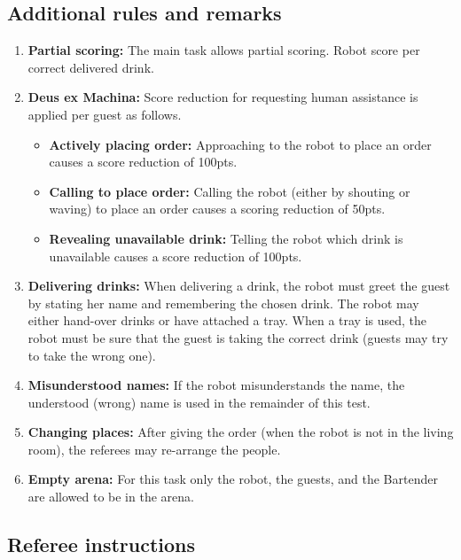 \subsection*{Additional rules and remarks}
\begin{enumerate}
	\item \textbf{Partial scoring:} The main task allows partial scoring.
	Robot score per correct delivered drink.

	\item \textbf{Deus ex Machina:} Score reduction for requesting human assistance is applied per guest as follows.
	\begin{itemize}[nosep]
		\item \textbf{Actively placing order:} Approaching to the robot to place an order causes a score reduction of 100pts.

		\item \textbf{Calling to place order:} Calling the robot (either by shouting or waving) to place an order causes a scoring reduction of 50pts.

		\item \textbf{Revealing unavailable drink:} Telling the robot which drink is unavailable causes a score reduction of 100pts.
	\end{itemize}

	\item \textbf{Delivering drinks:} When delivering a drink, the robot must greet the guest by stating her name and remembering the chosen drink.
	The robot may either hand-over drinks or have attached a tray.
	When a tray is used, the robot must be sure that the guest is taking the correct drink (guests may try to take the wrong one).

	\item \textbf{Misunderstood names:} If the robot misunderstands the name, the understood (wrong) name is used in the remainder of this test.

	\item \textbf{Changing places:} After giving the order (when the robot is not in the living room), the referees may re-arrange the people.

	\item \textbf{Empty arena:} For this task only the robot, the guests, and the Bartender are allowed to be in the arena.
\end{enumerate}

\subsection*{Referee instructions}

